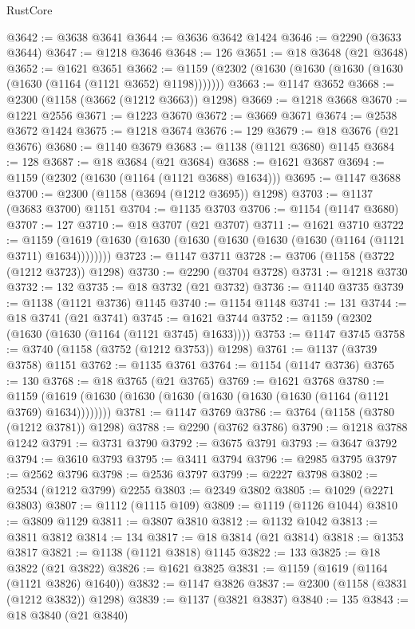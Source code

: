 \begin{lexlean}{RustCore}
\begin{coremodule}
@3642 := @3638 @3641
@3644 := @3636 @3642 @1424
@3646 := @2290 (@3633 @3644)
@3647 := @1218 @3646
@3648 := 126
@3651 := @18 @3648 (@21 @3648)
@3652 := @1621 @3651
@3662 := @1159 (@2302 (@1630 (@1630 (@1630 (@1630 (@1630 (@1164 (@1121 @3652) @1198)))))))
@3663 := @1147 @3652
@3668 := @2300 (@1158 (@3662 (@1212 @3663)) @1298)
@3669 := @1218 @3668
@3670 := @1221 @2556
@3671 := @1223 @3670
@3672 := @3669 @3671
@3674 := @2538 @3672 @1424
@3675 := @1218 @3674
@3676 := 129
@3679 := @18 @3676 (@21 @3676)
@3680 := @1140 @3679
@3683 := @1138 (@1121 @3680) @1145
@3684 := 128
@3687 := @18 @3684 (@21 @3684)
@3688 := @1621 @3687
@3694 := @1159 (@2302 (@1630 (@1164 (@1121 @3688) @1634)))
@3695 := @1147 @3688
@3700 := @2300 (@1158 (@3694 (@1212 @3695)) @1298)
@3703 := @1137 (@3683 @3700) @1151
@3704 := @1135 @3703
@3706 := @1154 (@1147 @3680)
@3707 := 127
@3710 := @18 @3707 (@21 @3707)
@3711 := @1621 @3710
@3722 := @1159 (@1619 (@1630 (@1630 (@1630 (@1630 (@1630 (@1630 (@1164 (@1121 @3711) @1634))))))))
@3723 := @1147 @3711
@3728 := @3706 (@1158 (@3722 (@1212 @3723)) @1298)
@3730 := @2290 (@3704 @3728)
@3731 := @1218 @3730
@3732 := 132
@3735 := @18 @3732 (@21 @3732)
@3736 := @1140 @3735
@3739 := @1138 (@1121 @3736) @1145
@3740 := @1154 @1148
@3741 := 131
@3744 := @18 @3741 (@21 @3741)
@3745 := @1621 @3744
@3752 := @1159 (@2302 (@1630 (@1630 (@1164 (@1121 @3745) @1633))))
@3753 := @1147 @3745
@3758 := @3740 (@1158 (@3752 (@1212 @3753)) @1298)
@3761 := @1137 (@3739 @3758) @1151
@3762 := @1135 @3761
@3764 := @1154 (@1147 @3736)
@3765 := 130
@3768 := @18 @3765 (@21 @3765)
@3769 := @1621 @3768
@3780 := @1159 (@1619 (@1630 (@1630 (@1630 (@1630 (@1630 (@1630 (@1164 (@1121 @3769) @1634))))))))
@3781 := @1147 @3769
@3786 := @3764 (@1158 (@3780 (@1212 @3781)) @1298)
@3788 := @2290 (@3762 @3786)
@3790 := @1218 @3788 @1242
@3791 := @3731 @3790
@3792 := @3675 @3791
@3793 := @3647 @3792
@3794 := @3610 @3793
@3795 := @3411 @3794
@3796 := @2985 @3795
@3797 := @2562 @3796
@3798 := @2536 @3797
@3799 := @2227 @3798
@3802 := @2534 (@1212 @3799) @2255
@3803 := @2349 @3802
@3805 := @1029 (@2271 @3803)
@3807 := @1112 (@1115 @109)
@3809 := @1119 (@1126 @1044)
@3810 := @3809 @1129
@3811 := @3807 @3810
@3812 := @1132 @1042
@3813 := @3811 @3812
@3814 := 134
@3817 := @18 @3814 (@21 @3814)
@3818 := @1353 @3817
@3821 := @1138 (@1121 @3818) @1145
@3822 := 133
@3825 := @18 @3822 (@21 @3822)
@3826 := @1621 @3825
@3831 := @1159 (@1619 (@1164 (@1121 @3826) @1640))
@3832 := @1147 @3826
@3837 := @2300 (@1158 (@3831 (@1212 @3832)) @1298)
@3839 := @1137 (@3821 @3837)
@3840 := 135
@3843 := @18 @3840 (@21 @3840)

\end{coremodule}
\end{lexlean}
